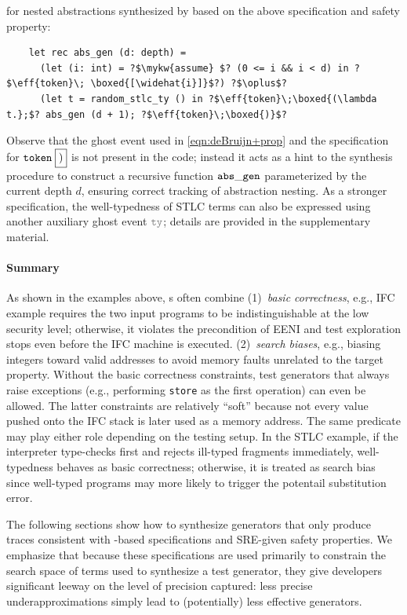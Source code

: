   for nested abstractions synthesized by \name{} based on the above specification
  and safety property:
  \begin{verbatim}
    let rec abs_gen (d: depth) =
      (let (i: int) = ?$\mykw{assume} $? (0 <= i && i < d) in ?$\eff{token}\; \boxed{[\widehat{i}]}$?) ?$\oplus$?
      (let t = random_stlc_ty () in ?$\eff{token}\;\boxed{(\lambda t.};$? abs_gen (d + 1); ?$\eff{token}\;\boxed{)}$?
  \end{verbatim}
  \noindent Observe that the ghost event used in
  \ref{eqn:deBruijn+prop} and the specification for
  $\boldsymbol{{\tt token}}\;\boxed{)}$ is not present in the code; instead it acts
  as a hint to the synthesis procedure to construct a recursive
  function ${\tt abs\_gen}$ parameterized by the current depth $d$,
  ensuring correct tracking of abstraction nesting. As a stronger specification, the well-typedness of STLC terms can also
  be expressed using another auxiliary ghost event $\effGray{ty}$;
  details are provided in the supplementary material.

\paragraph{Summary} As shown in the examples above, \tyName{}s often combine
(1)~\emph{basic correctness}, e.g., IFC example requires the two input programs to be indistinguishable at the low security level; otherwise, it violates the precondition of EENI and test exploration stops even before the IFC machine is executed.
(2)~\emph{search biases}, e.g., biasing integers
toward valid addresses to avoid memory faults unrelated to the target
property. Without the basic correctness constraints, test generators that always raise exceptions (e.g., performing \texttt{store} as the first operation) can even be allowed.
The latter constraints are relatively ``soft'' because not every value pushed
onto the IFC stack is later used as a memory address.
The same predicate may play either role depending on the testing setup.
In the STLC example, if the interpreter type-checks first and
rejects ill-typed fragments immediately, well-typedness behaves as basic correctness; otherwise, it is treated as search bias since well-typed programs may more likely to trigger the potentail substitution error.



  The following sections show how to synthesize generators that only
  produce traces consistent with \tyName{}-based specifications and
  SRE-given safety properties.  We emphasize that because these
  specifications are used primarily to constrain the search space of
  terms used to synthesize a test generator, they give developers
  significant leeway on the level of precision captured: less precise
  underapproximations simply lead to (potentially) less effective
  generators.


